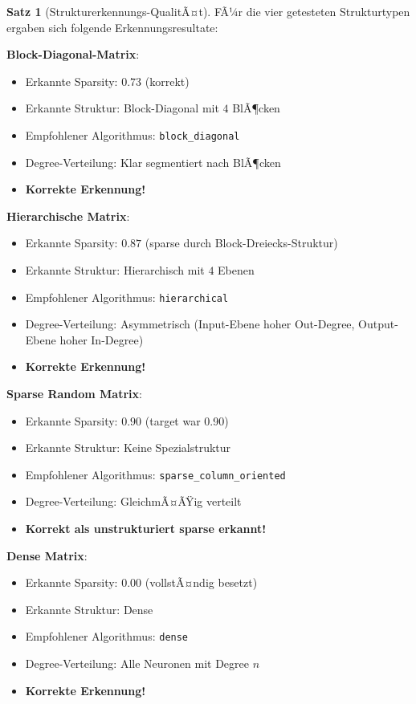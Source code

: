 ﻿\documentclass[a4paper,12pt]{report}
\theoremstyle{definition}
\newtheorem{satz}{Satz}
\begin{document}
	\begin{satz}[Strukturerkennungs-QualitÃ¤t]
		FÃ¼r die vier getesteten Strukturtypen ergaben sich folgende Erkennungsresultate:
		
		\textbf{Block-Diagonal-Matrix}:
		\begin{itemize}
			\item Erkannte Sparsity: $0.73$ (korrekt)
			\item Erkannte Struktur: Block-Diagonal mit $4$ BlÃ¶cken
			\item Empfohlener Algorithmus: \texttt{block\_diagonal}
			\item Degree-Verteilung: Klar segmentiert nach BlÃ¶cken
			\item \textbf{Korrekte Erkennung!}
		\end{itemize}
		
		\textbf{Hierarchische Matrix}:
		\begin{itemize}
			\item Erkannte Sparsity: $0.87$ (sparse durch Block-Dreiecks-Struktur)
			\item Erkannte Struktur: Hierarchisch mit $4$ Ebenen
			\item Empfohlener Algorithmus: \texttt{hierarchical}
			\item Degree-Verteilung: Asymmetrisch (Input-Ebene hoher Out-Degree, Output-Ebene hoher In-Degree)
			\item \textbf{Korrekte Erkennung!}
		\end{itemize}
		
		\textbf{Sparse Random Matrix}:
		\begin{itemize}
			\item Erkannte Sparsity: $0.90$ (target war 0.90)
			\item Erkannte Struktur: Keine Spezialstruktur
			\item Empfohlener Algorithmus: \texttt{sparse\_column\_oriented}
			\item Degree-Verteilung: GleichmÃ¤ÃŸig verteilt
			\item \textbf{Korrekt als unstrukturiert sparse erkannt!}
		\end{itemize}
		
		\textbf{Dense Matrix}:
		\begin{itemize}
			\item Erkannte Sparsity: $0.00$ (vollstÃ¤ndig besetzt)
			\item Erkannte Struktur: Dense
			\item Empfohlener Algorithmus: \texttt{dense}
			\item Degree-Verteilung: Alle Neuronen mit Degree $n$
			\item \textbf{Korrekte Erkennung!}
		\end{itemize}
	\end{satz}
	
\end{document}
